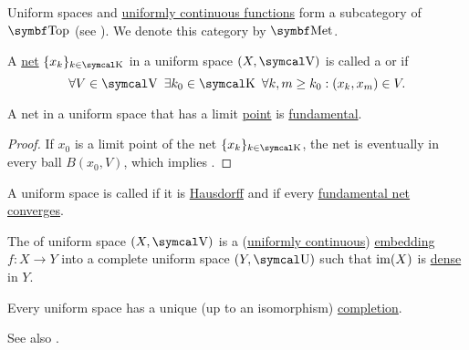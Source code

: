 \begin{definition}\label{def:category_of_uniform_spaces}
  Uniform spaces and \hyperref[def:uniform_continuity]{uniformly continuous functions} form a subcategory of \( \Cat{Top} \) (see ). We denote this category by \( \Cat{Met} \).
\end{definition}

\begin{definition}\label{def:fundamental_net}
  A \hyperref[def:topological_net]{net} \( \{ x_k \}_{k \in \CK} \) in a uniform space \( (X, \CV) \) is called a  or  if
  \begin{equation*}
    \forall V \in \CV \ \exists k_0 \in \CK \ \forall k, m \geq k_0 : (x_k, x_m) \in V.
  \end{equation*}
\end{definition}

\begin{lemma}\label{thm:convergent_net_is_fundamental}
  A net in a uniform space that has a limit \hyperref[def:net_convergence/limit]{point} is \hyperref[def:fundamental_net]{fundamental}.
\end{lemma}
\begin{proof}
  If \( x_0 \) is a limit point of the net \( \{ x_k \}_{k \in \CK} \), the net is eventually in every ball \( B(x_0, V) \), which implies .
\end{proof}

\begin{definition}\label{def:complete_uniform_space}
  A uniform space is called  if it is \hyperref[def:separation_axioms/T2]{Hausdorff} and if every \hyperref[def:fundamental_net]{fundamental net} \hyperref[def:net_convergence/limit]{converges}.

  The  of uniform space \( (X, \CV) \) is a (\hyperref[def:uniform_continuity]{uniformly continuous}) \hyperref[def:morphism_invertibility/monomorphism]{embedding} \( f: X \to Y \) into a complete uniform space \( (Y, \CU) \) such that \( \operatorname{im}(X) \) is \hyperref[def:topologically_dense_set/dense]{dense} in \( Y \).
\end{definition}

\begin{theorem}\label{thm:uniform_space_completion}
  Every uniform space has a unique (up to an isomorphism) \hyperref[def:complete_uniform_space]{completion}.

  See also .
\end{theorem}

